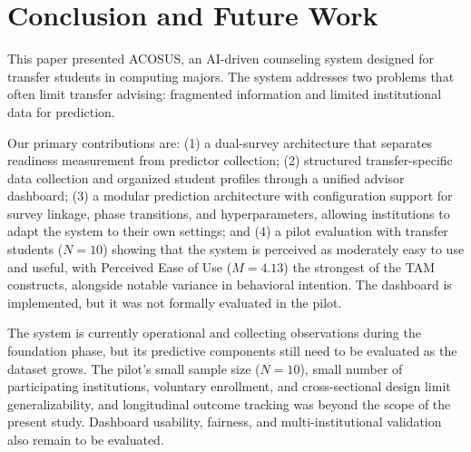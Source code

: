 \documentclass[letterpaper,11pt]{article}
\begin{document}
%
%

\section{Conclusion and Future Work}\label{sec:conclusion}

This paper presented ACOSUS, an AI-driven counseling system designed for transfer students in computing majors. The system addresses two problems that often limit transfer advising: fragmented information and limited institutional data for prediction.

Our primary contributions are: (1) a dual-survey architecture that separates readiness measurement from predictor collection; (2) structured transfer-specific data collection and organized student profiles through a unified advisor dashboard; (3) a modular prediction architecture with configuration support for survey linkage, phase transitions, and hyperparameters, allowing institutions to adapt the system to their own settings; and (4) a pilot evaluation with transfer students ($N=10$) showing that the system is perceived as moderately easy to use and useful, with Perceived Ease of Use ($M=4.13$) the strongest of the TAM constructs, alongside notable variance in behavioral intention. The dashboard is implemented, but it was not formally evaluated in the pilot.

The system is currently operational and collecting observations during the foundation phase, but its predictive components still need to be evaluated as the dataset grows. %
The pilot's small sample size ($N=10$), small number of participating institutions, voluntary enrollment, and cross-sectional design limit generalizability, and longitudinal outcome tracking was beyond the scope of the present study. Dashboard usability, fairness, and multi-institutional validation also remain to be evaluated.
\end{document}
